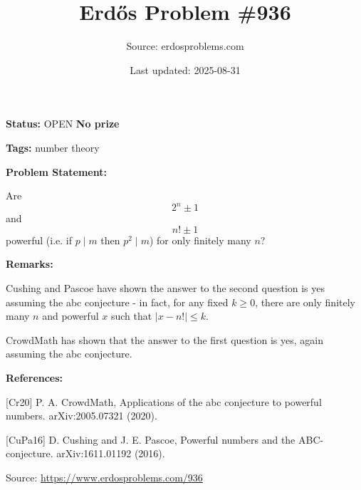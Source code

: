 \documentclass{article}
\title{Erd\H{o}s Problem \#936}
\date{Last updated: 2025-08-31}
\author{Source: erdosproblems.com}
\begin{document}
\maketitle

\noindent\textbf{Status:} OPEN \quad \textbf{No prize}

\noindent\textbf{Tags:} number theory

\medskip
\noindent\textbf{Problem Statement:}

Are\[2^n\pm 1\]and\[n!\pm 1\]powerful (i.e. if $p\mid m$ then $p^2\mid m$) for only finitely many $n$?

\bigskip
\noindent\textbf{Remarks:}

Cushing and Pascoe \cite{CuPa16} have shown the answer to the second question is yes assuming the abc conjecture - in fact, for any fixed $k\geq 0$, there are only finitely many $n$ and powerful $x$ such that $\lvert x-n!\rvert \leq k$.

CrowdMath \cite{Cr20} has shown that the answer to the first question is yes, again assuming the abc conjecture.

\bigskip
\noindent\textbf{References:}

[Cr20] P. A. CrowdMath, Applications of the abc conjecture to powerful numbers. arXiv:2005.07321 (2020).
 
 [CuPa16] D. Cushing and J. E. Pascoe, Powerful numbers and the ABC-conjecture. arXiv:1611.01192 (2016).

\bigskip
\noindent\small{Source: \url{https://www.erdosproblems.com/936}}
\end{document}
